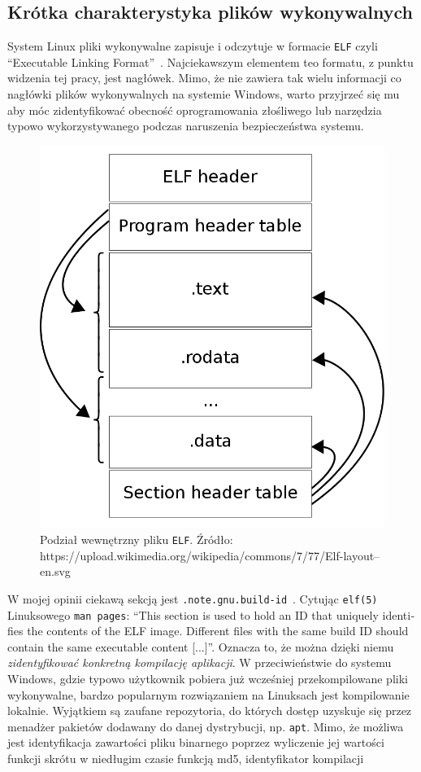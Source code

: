\subsection{Krótka charakterystyka plików wykonywalnych}
System Linux pliki wykonywalne zapisuje i odczytuje w formacie \texttt{ELF} czyli 
\foreignquote{english}{Executable Linking Format}~\cite{linux_foundation_tool_nodate}.
Najciekawszym elementem teo formatu, z punktu widzenia tej pracy, jest nagłówek. Mimo, że nie zawiera tak wielu informacji co
nagłówki plików wykonywalnych na systemie Windows, warto przyjrzeć się mu aby móc zidentyfikować obecność
oprogramowania złośliwego lub narzędzia typowo wykorzystywanego podczas naruszenia bezpieczeństwa systemu.
\begin{figure}[H]
    \centering
    \includegraphics[width=0.45\linewidth]{rysunki/elf.png}
    \caption{Podział wewnętrzny pliku \texttt{ELF}.\newline
    Źródło: https://upload.wikimedia.org/wikipedia/commons/7/77/Elf-layout--en.svg}
    \label{fig:enter-label}
\end{figure}
W mojej opinii ciekawą sekcją jest \texttt{.note.gnu.build-id}~\cite{elfman}. Cytując
\texttt{elf(5)} Linuksowego \texttt{man pages}: \foreignquote{english}{This section is used to hold an ID that uniquely
identifies the contents of the ELF image.  Different files
with the same build ID should contain the same executable
content [...]}. Oznacza to, że można dzięki niemu \emph{zidentyfikować konkretną kompilację aplikacji}.
W przeciwieństwie do systemu Windows, gdzie typowo użytkownik pobiera już wcześniej przekompilowane pliki wykonywalne,
bardzo popularnym rozwiązaniem na Linuksach jest kompilowanie lokalnie. Wyjątkiem są zaufane repozytoria, do których dostęp
uzyskuje się przez menadżer pakietów dodawany do danej dystrybucji, np. \texttt{apt}. Mimo, że możliwa jest identyfikacja 
zawartości pliku binarnego poprzez wyliczenie jej wartości funkcji skrótu w niedługim czasie funkcją md5, identyfikator kompilacji

